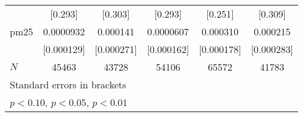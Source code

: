 {\begin{tabular}{l*{5}{c}}
            &     [0.293]         &     [0.303]         &     [0.293]         &     [0.251]         &     [0.309]         \\
[1em]
pm25        &   0.0000932         &    0.000141         &   0.0000607         &    0.000310\sym{*}  &    0.000215         \\
            &  [0.000129]         &  [0.000271]         &  [0.000162]         &  [0.000178]         &  [0.000283]         \\
\hline
\(N\)       &       45463         &       43728         &       54106         &       65572         &       41783         \\
\hline\hline
\multicolumn{6}{l}{\footnotesize Standard errors in brackets}\\
\multicolumn{6}{l}{\footnotesize \sym{*} \(p<0.10\), \sym{**} \(p<0.05\), \sym{***} \(p<0.01\)}\\
\end{tabular}
}
